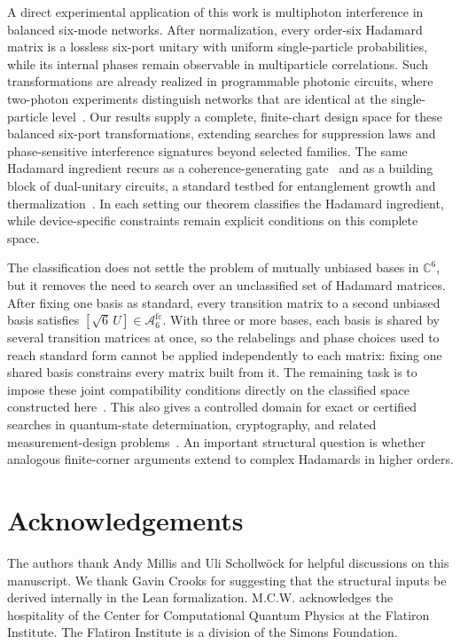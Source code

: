 \documentclass[aps,prx,reprint,nofootinbib,twoside,superscriptaddress,longbibliography,floatfix]{revtex4-2}
\theoremstyle{definition}
\newcommand{\FCAtlas}{\mathcal A}
\begin{document}
A direct experimental application of this work is multiphoton interference in balanced six-mode networks. After normalization, every order-six Hadamard matrix is a lossless six-port unitary with uniform single-particle probabilities, while its internal phases remain observable in multiparticle correlations. Such transformations are already realized in programmable photonic circuits, where two-photon experiments distinguish networks that are identical at the single-particle level~\cite{Carolan2015Universal,Laing2012BerryPhase,Tichy2010ZeroTransmission,Crespi2015Sylvester,Crespi2016FFT,Shchesnovich2015Partial}. Our results supply a complete, finite-chart design space for these balanced six-port transformations, extending searches for suppression laws and phase-sensitive interference signatures beyond selected families. The same Hadamard ingredient recurs as a coherence-generating gate~\cite{Yao2016MaximalCoherence} and as a building block of dual-unitary circuits, a standard testbed for entanglement growth and thermalization~\cite{Gutkin2020DualUnitary,Claeys2022StateDesigns}. In each setting our theorem classifies the Hadamard ingredient, while device-specific constraints remain explicit conditions on this complete space.

The classification does not settle the problem of mutually unbiased bases in $\mathbb C^6$, but it removes the need to search over an unclassified set of Hadamard matrices. After fixing one basis as standard, every transition matrix to a second unbiased basis satisfies $[\sqrt6\,U]\in\FCAtlas_6^{\mathrm{fc}}$.
With three or more bases, each basis is shared by several transition matrices at once, so the relabelings and phase choices used to reach standard form cannot be applied independently to each matrix: fixing one shared basis constrains every matrix built from it. The remaining task is to impose these joint compatibility conditions directly on the classified space constructed here~\cite{WoottersFields1989,BengtssonEtAl2007,HorodeckiRudnickiZyczkowski2022,McNultyWeigert2026,MatolcsiEtAl2026MUBTriplets}. 
This also gives a controlled domain for exact or certified searches in quantum-state determination, cryptography, and related measurement-design
problems~\cite{WoottersFields1989,Cerf2002,Englert2001,Aravind2003}. An important structural question is whether analogous finite-corner arguments extend to complex Hadamards in higher orders. 



\section*{Acknowledgements}
The authors thank Andy Millis and Uli Schollwöck for helpful discussions on this manuscript.
We thank Gavin Crooks for suggesting that the structural inputs be derived internally in the Lean formalization.
M.C.W. acknowledges the hospitality of the Center for Computational Quantum Physics at the Flatiron Institute. The Flatiron Institute is a division of the Simons Foundation.
\end{document}

